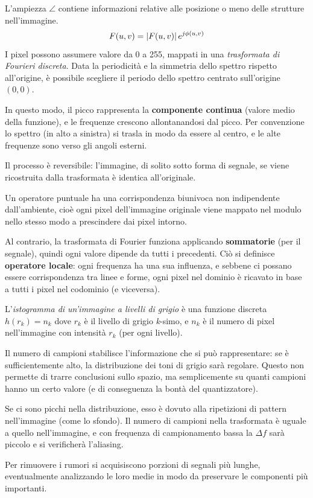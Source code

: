 L'ampiezza $\angle$ contiene informazioni relative alle posizione o meno delle strutture nell'immagine.
$$F(u, v) = \left|F(u, v)\right|e^{j\phi(u, v)}$$
I pixel possono assumere valore da 0 a 255, mappati in una \textit{trasformata di Fourieri discreta}. Data la periodicità e la simmetria dello spettro rispetto all'origine, è possibile scegliere il periodo dello spettro centrato sull'origine $(0, 0)$.

In questo modo, il picco rappresenta la \textbf{componente continua} (valore medio della funzione), e le frequenze crescono allontanandosi dal picco. Per convenzione lo spettro (in alto a sinistra) si trasla in modo da essere al centro, e le alte frequenze sono verso gli angoli esterni.

Il processo è reversibile: l'immagine, di solito sotto forma di segnale, se viene ricostruita dalla trasformata è identica all'originale.

Un operatore puntuale ha una corrispondenza biunivoca non indipendente dall'ambiente, cioè ogni pixel dell'immagine originale viene mappato nel modulo nello stesso modo a prescindere dai pixel intorno.

Al contrario, la trasformata di Fourier funziona applicando \textbf{sommatorie} (per il segnale), quindi ogni valore dipende da tutti i precedenti. Ciò si definisce \textbf{operatore locale}: ogni frequenza ha una sua influenza, e sebbene ci possano essere corrispondenza tra linee e forme, ogni pixel nel dominio è ricavato in base a tutti i pixel nel codominio (e viceversa).

L'\textit{istogramma di un'immagine a livelli di grigio} è una funzione discreta $h(r_k) = n_k$ dove $r_k$ è il livello di grigio \textit{k}-simo, e $n_k$ è il numero di pixel nell'immagine con intensità $r_k$ (per ogni livello).

Il numero di campioni stabilisce l'informazione che si può rappresentare: se è sufficientemente alto, la distribuzione dei toni di grigio sarà regolare. Questo non permette di trarre conclusioni sullo spazio, ma semplicemente su quanti campioni hanno un certo valore (e di conseguenza la bontà del quantizzatore).

Se ci sono picchi nella distribuzione, esso è dovuto alla ripetizioni di pattern nell'immagine (come lo sfondo). Il numero di campioni nella trasformata è uguale a quello nell'immagine, e con frequenza di campionamento bassa la $\Delta f$ sarà piccolo e si verificherà l'aliasing. 

Per rimuovere i rumori si acquisiscono porzioni di segnali più lunghe, eventualmente analizzando le loro medie in modo da preservare le componenti più importanti.

